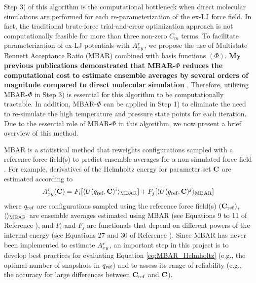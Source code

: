 \documentclass[12pt,a4paper]{article}
\newcommand{\bfm}[1]{{\bf #1}}
\newcommand{\C}{\bfm{C}}
\begin{document}

Step 3) of this algorithm is the computational bottleneck when direct molecular simulations are performed for each re-parameterization of the ex-LJ force field. In fact, the traditional brute-force trial-and-error optimization approach is not computationally feasible for more than three non-zero $C_m$ terms. To facilitate parameterization of ex-LJ potentials with $A_{xy}^{\rm r}$, we propose the use of Multistate Bennett Acceptance Ratio (MBAR) combined with basis functions $(\Phi)$. \textbf{My previous publications demonstrated that MBAR-$\Phi$ reduces the computational cost to estimate ensemble averages by several orders of magnitude compared to direct molecular simulation} \cite{Messerly2018_1,Messerly2018_2}. Therefore, utilizing MBAR-$\Phi$ in Step 3) is essential for this algorithm to be computationally tractable. In addition, MBAR-$\Phi$ can be applied in Step 1) to eliminate the need to re-simulate the high temperature and pressure state points for each iteration. Due to the essential role of MBAR-$\Phi$ in this algorithm, we now present a brief overview of this method. 


MBAR is a statistical method that reweights configurations sampled with a reference force field(s) to predict ensemble averages for a non-simulated force field \cite{shirts-chodera:jcp:2008:mbar,Messerly2018_1}. For example, derivatives of the Helmholtz energy for parameter set $\C$ are estimated according to 
\begin{equation} \label{eq:MBAR_Helmholtz}
A_{xy}^{\rm r}(\C) = F_i[\langle U(q_{\rm ref},\C)^i \rangle_{\rm MBAR}] + F_j[\langle U(q_{\rm ref},\C)^j \rangle_{\rm MBAR}]
\end{equation}
where $q_{\rm ref}$ are configurations sampled using the reference force field(s) $(\C_{\rm ref})$, $\langle\rangle_{\rm MBAR}$ are ensemble averages estimated using MBAR (see Equations 9 to 11 of Reference ), and $F_i$ and $F_j$ are functionals that depend on different powers of the internal energy (see Equations 27 and 30 of Reference ). Since MBAR has never been implemented to estimate $A_{xy}^{\rm r}$, an important step in this project is to develop best practices for evaluating Equation \ref{eq:MBAR_Helmholtz} (e.g., the optimal number of snapshots in $q_{\rm ref}$) and to assess its range of reliability (e.g., the accuracy for large differences between $\C_{\rm ref}$ and $\C$). 
\end{document}
